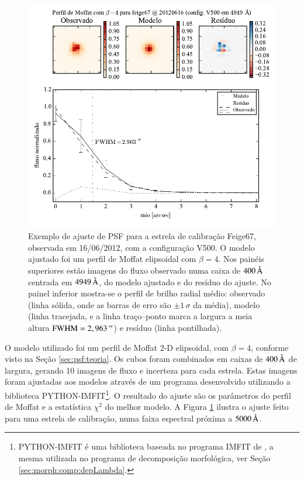 \begin{figure}
	\includegraphics{figuras/PSFMoffatBeta4_exemplo}
	\caption[Exemplo de ajuste de PSF para estrela de calibração.]
	{Exemplo de ajuste de PSF para a estrela de calibração Feige67, observada em
	16/06/2012, com a configuração V500. O modelo ajustado foi um perfil de
	Moffat elipsoidal com $\beta=4$. Nos painéis superiores estão imagens do fluxo
	observado numa caixa de $400\,\text{\normalfont\AA}$ centrada em $4949\,\text{\normalfont\AA}$,
	do modelo ajustado e do resíduo do ajuste. No painel inferior mostra-se o
	perfil de brilho radial médio: observado (linha sólida, onde as barras de erro
	são $\pm 1\,\sigma$ da média), modelo (linha tracejada, e a linha traço--ponto
	marca a largura a meia altura $\mathrm{FWHM}=2,963\,^{\prime\prime}$) e resíduo (linha
	pontilhada).}
	\label{fig:PSFExemplo}
\end{figure}

O modelo utilizado foi um perfil de Moffat 2-D elipsoidal, com $\beta\!=\!4$,
conforme visto na Seção \ref{sec:psf:teoria}. Os cubos foram combinados em
caixas de $400\,\text{\normalfont\AA}$ de largura, gerando 10 imagens de fluxo e incerteza
para cada estrela. Estas imagens foram ajustadas aos modelos através de um
programa desenvolvido utilizando a biblioteca PYTHON-IMFIT\footnote{PYTHON-IMFIT
é uma biblioteca baseada no programa IMFIT de \citet{Erwin2015}, a mesma
utilizada no programa de decomposição morfológica, ver Seção
\ref{sec:morph:comp:depLambda}.}. O resultado do ajuste são os parâmetros do
perfil de Moffat e a estatística $\chi^2$ do melhor modelo. A Figura
\ref{fig:PSFExemplo} ilustra o ajuste feito para uma estrela de calibração, numa
faixa espectral próxima a $5000\,\text{\normalfont\AA}$.

